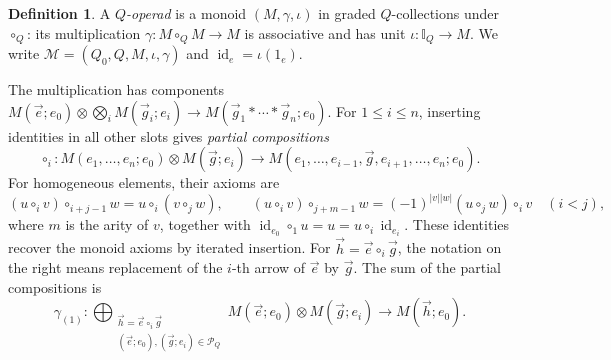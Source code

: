 \documentclass[11pt,letterpaper]{article}
\numberwithin{equation}{section}
\theoremstyle{plain}
\theoremstyle{definition}
\newtheorem{defn}[thm]{Definition}
\theoremstyle{remark}
\newcommand{\id}{\operatorname{id}}
\begin{document}
\begin{defn}\label{defn_operad_over_E}
A \textit{$Q$-operad} is a monoid $(M,\gamma,\iota)$ in graded
$Q$-collections under $\circ_Q$: its multiplication
$\gamma:M\circ_Q M\to M$ is associative and has unit
$\iota:\mathbb I_Q\to M$. We write
$\mathscr M=(Q_0,Q,M,\iota,\gamma)$ and
$\id_e=\iota(1_e)$.
\end{defn}
The multiplication has components
$ M(\vec e;e_0)\otimes\bigotimes_iM(\vec g_i;e_i)
 \to M(\vec g_1*\cdots*\vec g_n;e_0)$.
For $1\leq i\leq n$, inserting identities in all other slots gives \textit{partial compositions}
\[
 \circ_i:M(e_1,\ldots,e_n;e_0)\otimes M(\vec g;e_i)
 \longrightarrow M(e_1,\ldots,e_{i-1},\vec g,e_{i+1},\ldots,e_n;e_0).
\]
For homogeneous elements, their axioms are
\[
 (u\circ_i v)\circ_{i+j-1}w=u\circ_i(v\circ_jw),\qquad
 (u\circ_i v)\circ_{j+m-1}w
 =(-1)^{|v||w|}(u\circ_jw)\circ_i v\quad(i<j),
\]
where $m$ is the arity of $v$, together with
$\id_{e_0}\circ_1u=u=u\circ_i\id_{e_i}$.
These identities recover the monoid axioms by iterated insertion.
For $\vec h=\vec e\circ_i\vec g$, the notation on the right means
replacement of the $i$-th arrow of $\vec e$ by $\vec g$.
The sum of the partial compositions is
\begin{equation}\label{eq_gamma_(1)}
 \gamma_{(1)}:
 \bigoplus_{\substack{\vec h=\vec e\circ_i\vec g\\
 (\vec e;e_0),(\vec g;e_i)\in\mathcal P_Q}}
 M(\vec e;e_0)\otimes M(\vec g;e_i)
 \longrightarrow M(\vec h;e_0).
\end{equation}
\end{document}
